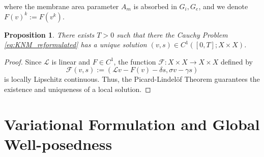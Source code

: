 \documentclass[a4paper,11pt]{article}
\newtheorem{proposition}[theorem]{Proposition}
\theoremstyle{definition}
\numberwithin{equation}{section}
\newcommand{\R}{\mathbb{R}}
\begin{document}
where %
the membrane area parameter $A_m$ is absorbed in $G_i, G_e$, and we denote $F(v)^k:=F(v^k)$. 
\begin{proposition}
	\label{prop:local}
	There exists $T>0$ such that there the Cauchy Problem \eqref{eq:KNM_reformulated} has a unique solution $(v,s)\in C^1([0,T];X \times X)$.
\end{proposition}
\begin{proof} 
	Since $\mathcal{L}$ is linear and $F\in C^1$, the function $\mathcal F: X \times X \to X \times X$ defined by
	\[
	\mathcal{F}(v,s):=\left(\mathcal{L}v - F(v) - \delta s, \sigma v - \gamma s\right)
	\]
	is locally Lipschitz continuous. Thus, the Picard-Lindel\"of Theorem \cite{CL55} guarantees the existence and uniqueness of a local solution.
\end{proof}









\section{Variational Formulation and Global Well-posedness}
\label{sec:variational}
\end{document}
